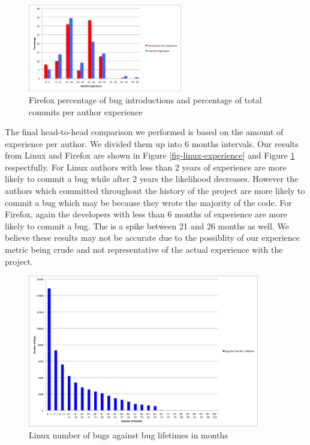 \begin{figure}
\begin{center}
\includegraphics[width=0.6\textwidth]{firefox_day_per_experience.png}
\end{center}
\caption{Firefox percentage of bug introductions and percentage of total commits per author experience}
\label{fig-firefox-experience}
\end{figure}

The final head-to-head comparison we performed is based on the amount
of experience per author. We divided them up into 6 months intervals. 
Our results from Linux and Firefox are shown in Figure
\ref{fig-linux-experience} and Figure \ref{fig-firefox-experience}
respectfully. For Linux authors with less than 2 years of experience
are more likely to commit a bug while after 2 years the likelihood
decreases. However the authors which committed throughout the history
of the project are more likely to commit a bug which may be because
they wrote the majority of the code. For Firefox, again the
developers with less than 6 months of experience are more likely to
commit a bug. The is a spike between 21 and 26 months as well. We
believe these results may not be accurate due to the possiblity of
our experience metric being crude and not representative of the 
actual experience with the project.

\begin{figure}
\begin{center}
\includegraphics[width=0.9\textwidth]{linux_bug_life.png}
\end{center}
\caption{Linux number of bugs against bug lifetimes in months}
\label{fig-linux-buglife}
\end{figure}

